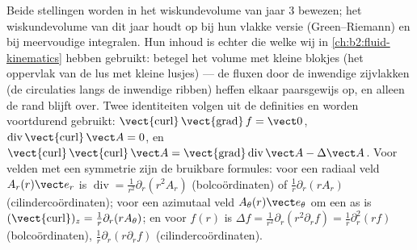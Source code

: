 \begin{remark}\label{rem:b2:maxwell-equations:whyadmitted}
Beide stellingen worden in het wiskundevolume van jaar 3 bewezen; het
wiskundevolume van dit jaar houdt op bij hun vlakke versie (Green--Riemann)
en bij meervoudige integralen. Hun inhoud is echter die welke wij in
\cref{ch:b2:fluid-kinematics} hebben gebruikt: betegel het volume met kleine
blokjes (het oppervlak van de lus met kleine lusjes) --- de fluxen door de
inwendige zijvlakken (de circulaties langs de inwendige ribben) heffen
elkaar paarsgewijs op, en alleen de rand blijft over. Twee identiteiten
volgen uit de definities en worden voortdurend gebruikt:
$\operatorname{\vect{curl}}\operatorname{\vect{grad}}f = \vect 0$,
$\operatorname{div}\operatorname{\vect{curl}}\vect A = 0$, en
$\operatorname{\vect{curl}}\operatorname{\vect{curl}}\vect A = \operatorname{\vect{grad}}
\operatorname{div}\vect A - \Delta\vect A$.
Voor velden met een symmetrie zijn de bruikbare formules: voor een radiaal
veld $A_r(r)\vect e_r$ is
$\operatorname{div}
= \frac1{r^2}\partial_r(r^2A_r)$ (bolcoördinaten) of
$\frac1r\partial_r(rA_r)$ (cilindercoördinaten); voor een azimutaal veld
$A_\theta(r)\vect e_\theta$ om een as is
$(\operatorname{\vect{curl}})_z = \frac1r\partial_r(rA_\theta)$; en voor
$f(r)$ is
$\Delta f = \frac1{r^2}\partial_r(r^2\partial_rf) = \frac1r\partial_r^2(rf)$
(bolcoördinaten), $\frac1r\partial_r(r\partial_rf)$ (cilindercoördinaten).
\end{remark}

